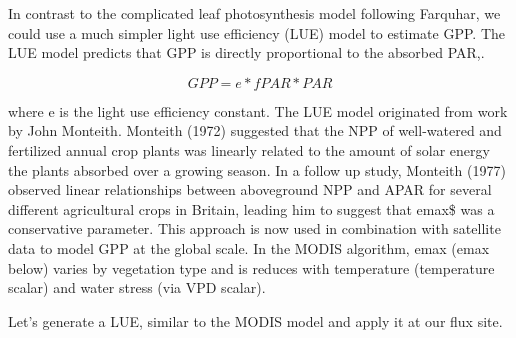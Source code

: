 \documentclass[]{article}
\begin{document}
In contrast to the complicated leaf photosynthesis model following
Farquhar, we could use a much simpler light use efficiency (LUE) model
to estimate GPP. The LUE model predicts that GPP is directly
proportional to the absorbed PAR,.

\[GPP = e * fPAR * PAR\]

where e is the light use efficiency constant. The LUE model originated
from work by John Monteith. Monteith (1972) suggested that the NPP of
well-watered and fertilized annual crop plants was linearly related to
the amount of solar energy the plants absorbed over a growing season. In
a follow up study, Monteith (1977) observed linear relationships between
aboveground NPP and APAR for several different agricultural crops in
Britain, leading him to suggest that emax\$ was a conservative
parameter. This approach is now used in combination with satellite data
to model GPP at the global scale. In the MODIS algorithm, emax (emax
below) varies by vegetation type and is reduces with temperature
(temperature scalar) and water stress (via VPD scalar).

Let's generate a LUE, similar to the MODIS model and apply it at our
flux site.
\end{document}
